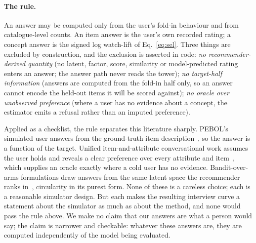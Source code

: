 \documentclass[manuscript,screen]{acmart}
\begin{document}
\paragraph{The rule.} An answer may be computed only from the user's fold-in behaviour and from catalogue-level counts. An item answer is the user's own recorded rating; a concept answer is the signed log watch-lift of Eq.~\eqref{eq:sel}. Three things are excluded by construction, and the exclusion is asserted in code: \emph{no recommender-derived quantity} (no latent, factor, score, similarity or model-predicted rating enters an answer; the answer path never reads the tower); \emph{no target-half information} (answers are computed from the fold-in half only, so an answer cannot encode the held-out items it will be scored against); \emph{no oracle over unobserved preference} (where a user has no evidence about a concept, the estimator emits a refusal rather than an imputed preference).

Applied as a checklist, the rule separates this literature sharply. PEBOL's simulated user answers from the ground-truth item description~\citep{austin2024bayesian}, so the answer is a function of the target. Unified item-and-attribute conversational work assumes the user holds and reveals a clear preference over every attribute and item~\citep{deng2021unicorn}, which supplies an oracle exactly where a cold user has no evidence. Bandit-over-arms formulations draw answers from the same latent space the recommender ranks in~\citep{li2021seamlessly}, circularity in its purest form. None of these is a careless choice; each is a reasonable simulator design. But each makes the resulting interview curve a statement about the simulator as much as about the method, and none would pass the rule above. We make no claim that our answers are what a person would say; the claim is narrower and checkable: whatever these answers are, they are computed independently of the model being evaluated.
\end{document}
